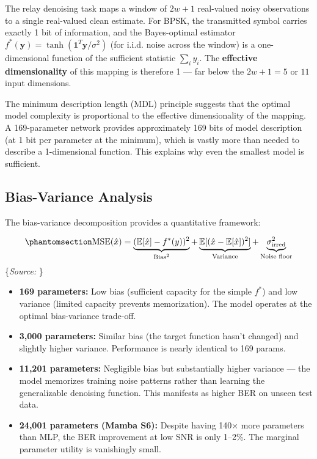 \documentclass[
  english,
  12pt,
  12pt,
  a4paper,
  oneside]{report}
\providecommand{\tightlist}{%
  \setlength{\itemsep}{0pt}\setlength{\parskip}{0pt}}
\begin{document}
The relay denoising task maps a window of \(2w+1\) real-valued noisy observations to a single real-valued clean estimate. For BPSK, the transmitted symbol carries exactly 1 bit of information, and the Bayes-optimal estimator \(f^*(\mathbf{y}) = \tanh(\mathbf{1}^T \mathbf{y} / \sigma^2)\) (for i.i.d. noise across the window) is a one-dimensional function of the sufficient statistic \(\sum_i y_i\). The \textbf{effective dimensionality} of this mapping is therefore 1 --- far below the \(2w+1 = 5\) or \(11\) input dimensions.

The minimum description length (MDL) principle suggests that the optimal model complexity is proportional to the effective dimensionality of the mapping. A 169-parameter network provides approximately 169 bits of model description (at 1 bit per parameter at the minimum), which is vastly more than needed to describe a 1-dimensional function. This explains why even the smallest model is sufficient.

\subsection{Bias-Variance Analysis}\label{sec:bias-variance-analysis}

The bias-variance decomposition provides a quantitative framework:

\begin{equation}\protect\phantomsection\label{eq:bias-variance-relay}{\text{MSE}(\hat{x}) = \underbrace{(\mathbb{E}[\hat{x}] - f^*(y))^2}_{\text{Bias}^2} + \underbrace{\mathbb{E}[(\hat{x} - \mathbb{E}[\hat{x}])^2]}_{\text{Variance}} + \underbrace{\sigma^2_{\text{irred}}}_{\text{Noise floor}}
}\end{equation} \footnotesize\{\textit{Source: \1}\}\normalsize

\begin{itemize}
\tightlist
\item
  \textbf{169 parameters:} Low bias (sufficient capacity for the simple \(f^*\)) and low variance (limited capacity prevents memorization). The model operates at the optimal bias-variance trade-off.
\item
  \textbf{3,000 parameters:} Similar bias (the target function hasn't changed) and slightly higher variance. Performance is nearly identical to 169 params.
\item
  \textbf{11,201 parameters:} Negligible bias but substantially higher variance --- the model memorizes training noise patterns rather than learning the generalizable denoising function. This manifests as higher BER on unseen test data.
\item
  \textbf{24,001 parameters (Mamba S6):} Despite having 140× more parameters than MLP, the BER improvement at low SNR is only 1--2\%. The marginal parameter utility is vanishingly small.
\end{itemize}
\end{document}
